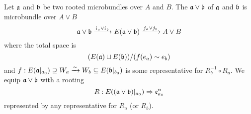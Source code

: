 \begin{mydefinition}
    Let $\mathfrak{a}$ and $\mathfrak{b}$ be two rooted microbundles over $A$ and $B$.
    The  $\mathfrak{a} \vee \mathfrak{b}$ of $\mathfrak{a}$ and $\mathfrak{b}$ is microbundle over $A \vee B$
    \[ \mathfrak{a} \vee \mathfrak{b} \xrightarrow{i_{\mathfrak{a}} \vee i_{\mathfrak{b}}} E(\mathfrak{a} \vee \mathfrak{b}) \xrightarrow{j_{\mathfrak{a}} \vee j_{\mathfrak{b}}} A \vee B \]
    where the total space is
    \[ (E(\mathfrak{a}) \sqcup E(\mathfrak{b})) / (f(e_a) \sim e_b) \]
    and $f: E(\mathfrak{a}\vert_{a_0}) \supseteq{} W_a \xrightarrow{\sim} W_b \subseteq{} E(\mathfrak{b}\vert_{b_0})$ is some representative for $R_b^{-1} \circ R_a$.
    We equip $\mathfrak{a} \vee \mathfrak{b}$ with a rooting
    \[ R: E((\mathfrak{a} \vee \mathfrak{b})\vert_{a_0}) \Rightarrow{} \mathfrak{e}^n_{a_0} \]
    represented by any representative for $R_a$ (or $R_b$).
\end{mydefinition}
